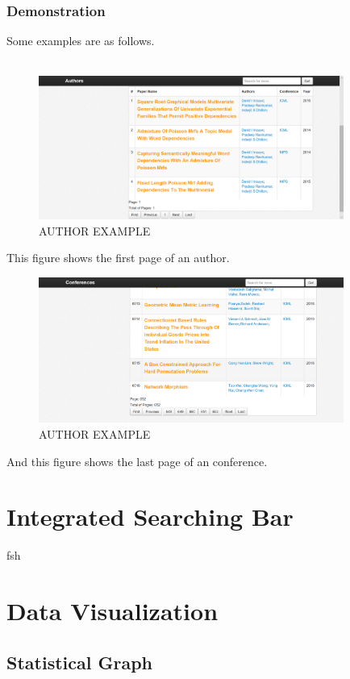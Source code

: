\documentclass{book}
\begin{document}
\subsection{Demonstration}
Some examples are as follows.\\\\
\begin{figure}[H]
\centering
\includegraphics[width=10.0cm]{img/dsw_author.png}
\caption{AUTHOR EXAMPLE}
\end{figure}
This figure shows the first page of an author.\\
\begin{figure}[H]
\centering
\includegraphics[width=10.0cm]{img/dsw_con.png}
\caption{AUTHOR EXAMPLE}
\end{figure}
And this figure shows the last page of an conference.\\



\chapter {Integrated Searching Bar}

fsh


\chapter {Data Visualization}


\section {Statistical Graph}
\end{document}

